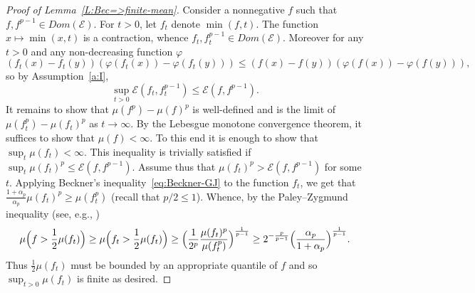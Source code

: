 \documentclass[a4paper]{amsart}
\theoremstyle{definition}
\theoremstyle{remark}
\numberwithin{equation}{section}
\newcommand*{\calE}{\mathcal{E}}
\begin{document}
\begin{proof}[Proof of Lemma~\ref{L:Bec=>finite-mean}]
	Consider a nonnegative  $f$ such that $f,f^{p-1}\in Dom(\calE)$.
	For $t > 0$, let $f_t$ denote $\min(f,t)$.
	The function $x\mapsto \min(x,t)$ is a contraction, whence $f_t,f_t^{p-1}\in Dom(\calE)$.
	Moreover for any $t>0$ and any non-decreasing function $\varphi$
	\[
		(f_t(x)-f_t(y))(\varphi(f_t(x))-\varphi(f_t(y))) \le (f(x)-f(y))(\varphi(f(x))-\varphi(f(y))),
	\]
	so by Assumption~\ref{a:I},
	\[
		\sup_{t>0}\calE(f_t,f_t^{p-1})\le \calE(f,f^{p-1}).
	\]
	It remains to show that $\mu(f^p)-\mu(f)^p$ is well-defined and is the limit of $\mu(f_t^p)-\mu(f_t)^p$ as $t\to\infty$. By the Lebesgue monotone convergence theorem, it suffices to show that $\mu(f)<\infty$.
	To this end it is enough to show that $\sup_t \mu(f_t) < \infty$. This inequality is trivially satisfied if $\sup_t \mu(f_t)^p \le \calE(f,f^{p-1})$. Assume thus that
	$\mu(f_{t})^p > \calE(f,f^{p-1})$ for some $t$.
	Applying Beckner's inequality~\eqref{eq:Beckner-GJ} to the function $f_{t}$, we get that $\frac{1+\alpha_p}{\alpha_p}\mu(f_{t})^p \ge \mu(f_{t}^p)$ (recall that $p/2\leq 1$).
	Whence, by the Paley--Zygmund inequality (see, e.g., \cite[Corollary 3.3.2]{MR1666908})
	\[
		\mu\Big(f > \frac{1}{2}\mu(f_{t})\Big)
		\ge
		\mu\Big(f_{t} > \frac{1}{2}\mu(f_{t})\Big)
		\ge
		\Bigl(\frac{1}{2^p}\frac{\mu(f_{t})^p}{\mu(f_{t}^p)}\Bigr)^{\frac{1}{p-1}}
		\ge
		2^{-\frac{p}{p-1}} \Bigl(\frac{\alpha_p}{1+\alpha_p}\Bigr)^{\frac{1}{p-1}}.
\]
	Thus $\frac{1}{2}\mu(f_t)$ must be bounded by an appropriate quantile of $f$ and so $\sup_{t>0} \mu(f_t)$ is finite as desired.
\end{proof}
\end{document}
